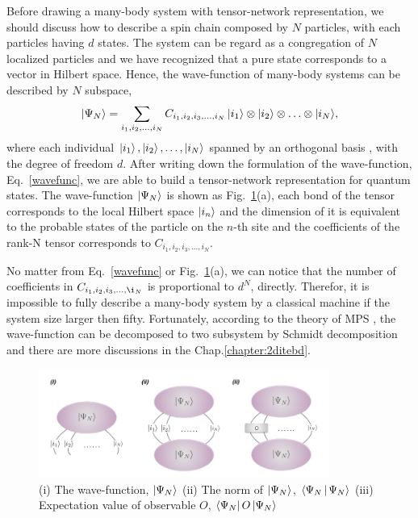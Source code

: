 Before drawing a many-body system with tensor-network representation, we should discuss how to describe a spin chain composed by $N$ particles, with each particles having $d$ states. The system can be regard as a congregation of $N$ localized particles and we have recognized that a pure state corresponds to a vector in Hilbert space. Hence, the wave-function of many-body systems can be described by $N$ subspace,
\begin{align}
	\Ket{\Psi_{N}} =\sum_{i_1,i_2,\ldots,i_N}{C_{i_1,i_2,i_3,\ldots,i_N}\Ket{i_1}\otimes\Ket{i_2}\otimes \ldots \otimes \Ket{i_N}},
	\label{wavefunc}
\end{align}
where each individual $\Ket{i_1}, \Ket{i_2},\ldots, \Ket{i_N}$ spanned by an orthogonal basis , with the degree of freedom $d$. After writing down the formulation of the wave-function, Eq.~\ref{wavefunc}, we are able to build a tensor-network representation for quantum states. The wave-function $\Ket{\Psi_N}$ is shown as Fig.~\ref{fig225}(a), each bond of the tensor corresponds to the local Hilbert space $\Ket{i_n}$ and the dimension of it is equivalent to the probable states of the particle on the $n$-th site and the coefficients of the rank-N tensor corresponds to $C_{i_1,i_2,i_3,\ldots,i_N}$.

No matter from Eq.~\ref{wavefunc} or Fig.~\ref{fig225}(a), we can notice that the number of coefficients in $C_{i_1,i_2,i_3,\ldots,\i_N}$ is proportional to $d^N$, directly. Therefor, it is impossible to fully describe a many-body system by a classical machine if the system size larger then fifty. Fortunately, according to the theory of MPS \cite{PhysRevB.73.094423} \cite{PhysRevLett.75.3537}, the wave-function can be decomposed to two subsystem by Schmidt decomposition and there are more discussions in the Chap.\ref{chapter:2ditebd}. 
\begin{figure}[ht]
	\centering
	\includegraphics[width=0.85\textwidth]{figures/fig225.png}
	\caption[Represent wave-function of quntum states of TN]{(i) The wave-function, $\Ket{\Psi_N}$ (ii) The norm of $\Ket{\Psi_N}$, $\Braket{\Psi_N|\Psi_N}$ (iii) Expectation value of observable $O$, $\Bra{\Psi_N}O\Ket{\Psi_N}$}
	\label{fig225}
\end{figure}
